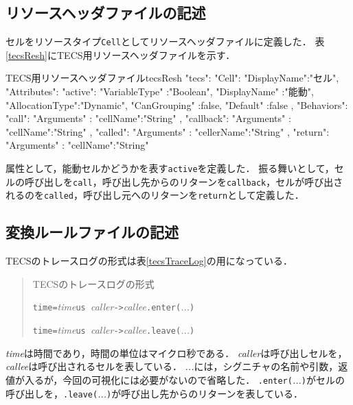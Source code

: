 \subsection{リソースヘッダファイルの記述}

セルをリソースタイプ{\tt Cell}としてリソースヘッダファイルに定義した．
表\ref{tecsResh}にTECS用リソースヘッダファイルを示す．

\begin{File}{TECS用リソースヘッダファイル}{tecsResh}
{
  "tecs":
  {
    "Cell":{
      "DisplayName":"セル",
      "Attributes":{
        "active":{
          "VariableType"  :"Boolean",
          "DisplayName"   :"能動",
          "AllocationType":"Dynamic",
          "CanGrouping"   :false,
          "Default"       :false
        }
      },
      "Behaviors":{
        "call":{
          "Arguments" :{
            "cellName":"String"
          }
        },
        "callback":{
          "Arguments" :{
            "cellName":"String"
          }
        },
        "called":{
          "Arguments"   :{
            "cellerName":"String"
          }
        },
        "return":{
          "Arguments" :{
            "cellName":"String"
          }
        }
      }
    }
  }
}
\end{File}

属性として，能動セルかどうかを表す{\tt active}を定義した．
振る舞いとして，セルの呼び出しを{\tt call}，呼び出し先からのリターンを{\tt callback}，セルが呼び出されるのを{\tt called}，呼び出し元へのリターンを{\tt return}として定義した．

\subsection{変換ルールファイルの記述}

TECSのトレースログの形式は表\ref{tecsTraceLog}の用になっている．

\begin{table}[p]
\begin{quote}
\caption{TECSのトレースログの形式}
\label{tecsTraceLog}
\begin{breakbox}
{\tt time=}{\it time}{\tt us }{\it caller}{\tt ->}{\it callee}{\tt .enter(}{\it ...}{\tt )}

{\tt time=}{\it time}{\tt us }{\it caller}{\tt ->}{\it callee}{\tt .leave(}{\it ...}{\tt )}
\end{breakbox}
\end{quote}
\end{table}

{\it time}は時間であり，時間の単位はマイクロ秒である．
{\it caller}は呼び出しセルを，{\it callee}は呼び出されるセルを表している．
{\it ...}には，シグニチャの名前や引数，返値が入るが，今回の可視化には必要がないので省略した．
{\tt .enter(}{\it ...}{\tt )}がセルの呼び出しを，{\tt .leave(}{\it ...}{\tt )}が呼び出し先からのリターンを表している．

